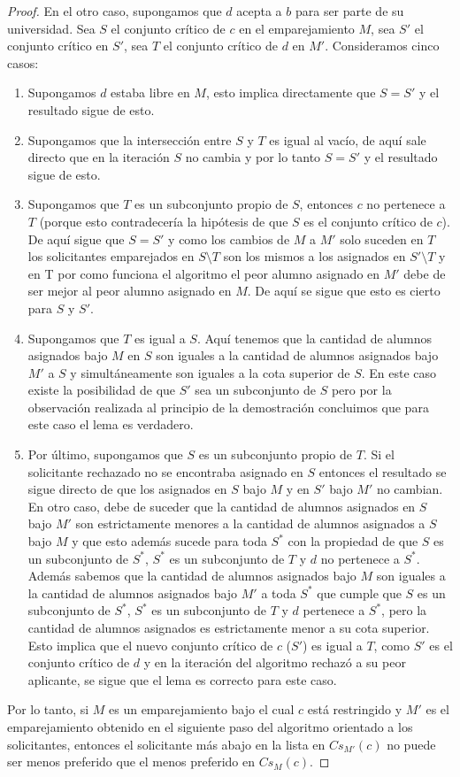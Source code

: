 \begin{proof}
En el otro caso, supongamos que $d$ acepta a $b$ para ser parte de su universidad. Sea $S$ el conjunto crítico de $c$ en el emparejamiento $M$, sea $S'$ el conjunto crítico en $S'$, sea $T$ el conjunto crítico de $d$ en $M'$. Consideramos cinco casos:
\begin{enumerate}
\item Supongamos $d$ estaba libre en $M$, esto implica directamente que $S=S'$ y el resultado sigue de esto.
\item Supongamos que la intersección entre $S$ y $T$ es igual al vacío, de aquí sale directo que en la iteración $S$ no cambia y por lo tanto $S=S'$ y el resultado sigue de esto.
\item Supongamos que $T$ es un subconjunto propio de $S$, entonces $c$ no pertenece a $T$ (porque esto contradecería la hipótesis de que $S$ es el conjunto crítico de $c$). De aquí sigue que $S=S'$ y como los cambios de $M$  a $M'$ solo suceden en $T$ los solicitantes emparejados en $S\setminus T$ son los mismos a los asignados en $S' \setminus T$ y en T por como funciona el algoritmo el peor alumno asignado en $M'$ debe de ser mejor al peor alumno asignado en $M$. De aquí se sigue que esto es cierto para $S$ y $S'$.
\item Supongamos que $T$ es igual a $S$. Aquí tenemos que la cantidad de alumnos asignados bajo $M$ en $S$ son iguales a la cantidad de alumnos asignados bajo $M'$ a $S$ y simultáneamente son iguales a la cota superior de $S$. En este caso existe la posibilidad de que $S'$ sea un subconjunto de $S$ pero por la observación realizada al principio de la demostración concluimos que para este caso el lema es verdadero.
\item Por último, supongamos que $S$ es un subconjunto propio de $T$. Si el solicitante rechazado no se encontraba asignado en $S$ entonces el resultado se sigue directo de que los asignados en $S$ bajo $M$ y en $S'$ bajo $M'$ no cambian. En otro caso, debe de suceder que la cantidad de alumnos asignados en $S$ bajo $M'$ son estrictamente menores a la cantidad de alumnos asignados a $S$ bajo $M$ y que esto además sucede para toda $S^*$ con la propiedad de que $S$ es un subconjunto de $S^*$, $S^*$ es un subconjunto de $T$ y $d$ no pertenece a $S^*$. Además sabemos que la cantidad de alumnos asignados bajo $M$ son iguales a la cantidad de alumnos asignados bajo $M'$ a toda $S^*$ que cumple que $S$ es un subconjunto de $S^*$, $S^*$ es un subconjunto de $T$ y $d$ pertenece a $S^*$, pero la cantidad de alumnos asignados es estrictamente menor a su cota superior.  Esto implica que el nuevo conjunto crítico de $c$ ($S'$) es igual a $T$, como $S'$ es el conjunto crítico de $d$ y en la iteración del algoritmo rechazó a su peor aplicante, se sigue que el lema es correcto para este caso. 
\end{enumerate}
Por lo tanto, si $M$ es un emparejamiento bajo el cual $c$ está restringido y $M'$ es el emparejamiento obtenido en el siguiente paso del algoritmo orientado a los solicitantes, entonces el solicitante más abajo en la lista en  $Cs_{M'}(c)$ no puede ser menos preferido que el menos preferido en $Cs_M(c)$.
\end{proof}


